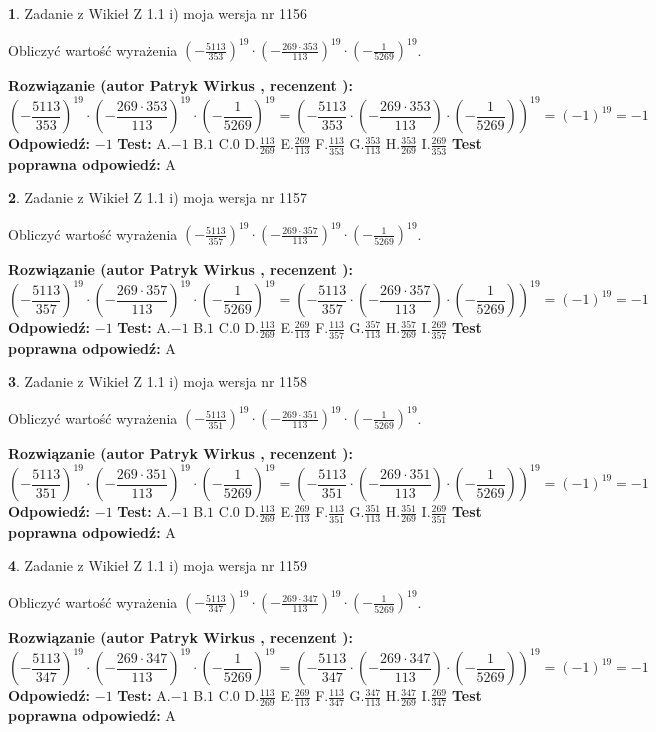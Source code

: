 \documentclass[12pt, a4paper]{article}
\theoremstyle{definition} %
\newtheorem{zad}{}
\newcommand{\zadStart}[1]{\begin{zad}#1\newline}
\newcommand{\zadStop}{\end{zad}}
\newcommand{\rozwStart}[2]{\noindent \textbf{Rozwiązanie (autor #1 , recenzent #2): }\newline}
\newcommand{\rozwStop}{\newline}
\newcommand{\odpStart}{\noindent \textbf{Odpowiedź:}\newline}
\newcommand{\odpStop}{\newline}
\newcommand{\testStart}{\noindent \textbf{Test:}\newline}
\newcommand{\testStop}{\newline}
\newcommand{\kluczStart}{\noindent \textbf{Test poprawna odpowiedź:}\newline}
\newcommand{\kluczStop}{\newline}
\begin{document}
\zadStart{Zadanie z Wikieł Z 1.1 i) moja wersja nr 1156}

Obliczyć wartość wyrażenia $(-\frac{5113}{353})^{19} \cdot (-\frac{269 \cdot 353}{113})^{19} \cdot (-\frac{1}{5269})^{19}$.
\zadStop
\rozwStart{Patryk Wirkus}{}
$$(-\frac{5113}{353})^{19} \cdot (-\frac{269 \cdot 353}{113})^{19} \cdot (-\frac{1}{5269})^{19} = (-\frac{5113}{353} \cdot (-\frac{269 \cdot 353}{113}) \cdot (-\frac{1}{5269}))^{19} = (-1)^{19} = -1$$
\rozwStop
\odpStart
$-1$
\odpStop
\testStart
A.$-1$ B.$1$ C.$0$ D.$\frac{113}{269}$ E.$\frac{269}{113}$
F.$\frac{113}{353}$ G.$\frac{353}{113}$
H.$\frac{353}{269}$
I.$\frac{269}{353}$
\testStop
\kluczStart
A
\kluczStop



\zadStart{Zadanie z Wikieł Z 1.1 i) moja wersja nr 1157}

Obliczyć wartość wyrażenia $(-\frac{5113}{357})^{19} \cdot (-\frac{269 \cdot 357}{113})^{19} \cdot (-\frac{1}{5269})^{19}$.
\zadStop
\rozwStart{Patryk Wirkus}{}
$$(-\frac{5113}{357})^{19} \cdot (-\frac{269 \cdot 357}{113})^{19} \cdot (-\frac{1}{5269})^{19} = (-\frac{5113}{357} \cdot (-\frac{269 \cdot 357}{113}) \cdot (-\frac{1}{5269}))^{19} = (-1)^{19} = -1$$
\rozwStop
\odpStart
$-1$
\odpStop
\testStart
A.$-1$ B.$1$ C.$0$ D.$\frac{113}{269}$ E.$\frac{269}{113}$
F.$\frac{113}{357}$ G.$\frac{357}{113}$
H.$\frac{357}{269}$
I.$\frac{269}{357}$
\testStop
\kluczStart
A
\kluczStop



\zadStart{Zadanie z Wikieł Z 1.1 i) moja wersja nr 1158}

Obliczyć wartość wyrażenia $(-\frac{5113}{351})^{19} \cdot (-\frac{269 \cdot 351}{113})^{19} \cdot (-\frac{1}{5269})^{19}$.
\zadStop
\rozwStart{Patryk Wirkus}{}
$$(-\frac{5113}{351})^{19} \cdot (-\frac{269 \cdot 351}{113})^{19} \cdot (-\frac{1}{5269})^{19} = (-\frac{5113}{351} \cdot (-\frac{269 \cdot 351}{113}) \cdot (-\frac{1}{5269}))^{19} = (-1)^{19} = -1$$
\rozwStop
\odpStart
$-1$
\odpStop
\testStart
A.$-1$ B.$1$ C.$0$ D.$\frac{113}{269}$ E.$\frac{269}{113}$
F.$\frac{113}{351}$ G.$\frac{351}{113}$
H.$\frac{351}{269}$
I.$\frac{269}{351}$
\testStop
\kluczStart
A
\kluczStop



\zadStart{Zadanie z Wikieł Z 1.1 i) moja wersja nr 1159}

Obliczyć wartość wyrażenia $(-\frac{5113}{347})^{19} \cdot (-\frac{269 \cdot 347}{113})^{19} \cdot (-\frac{1}{5269})^{19}$.
\zadStop
\rozwStart{Patryk Wirkus}{}
$$(-\frac{5113}{347})^{19} \cdot (-\frac{269 \cdot 347}{113})^{19} \cdot (-\frac{1}{5269})^{19} = (-\frac{5113}{347} \cdot (-\frac{269 \cdot 347}{113}) \cdot (-\frac{1}{5269}))^{19} = (-1)^{19} = -1$$
\rozwStop
\odpStart
$-1$
\odpStop
\testStart
A.$-1$ B.$1$ C.$0$ D.$\frac{113}{269}$ E.$\frac{269}{113}$
F.$\frac{113}{347}$ G.$\frac{347}{113}$
H.$\frac{347}{269}$
I.$\frac{269}{347}$
\testStop
\kluczStart
A
\kluczStop
\end{document}
